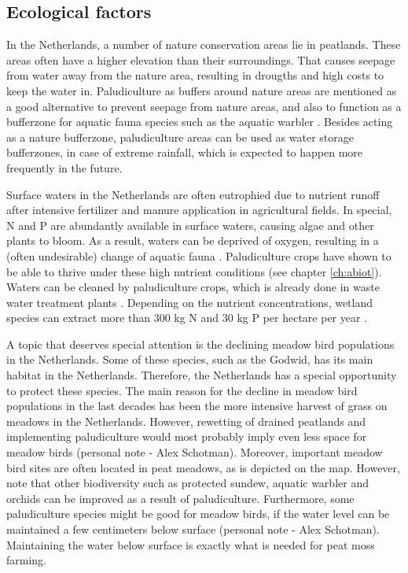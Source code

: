 \documentclass[a4paper,12pt]{scrbook}
\begin{document}
\subsection{Ecological factors}
In the Netherlands, a number of nature conservation areas lie in peatlands. These areas often have a higher elevation than their surroundings. That causes seepage from water away from the nature area, resulting in drougths and high costs to keep the water in. Paludiculture as buffers around nature areas are mentioned as a good alternative to prevent seepage from nature areas, and also to function as a bufferzone for aquatic fauna species such as the aquatic warbler \citep{van2013rewetting}. Besides acting as a nature bufferzone, paludiculture areas can be used as water storage bufferzones, in case of extreme rainfall, which is expected to happen more frequently in the future. 

Surface waters in the Netherlands are often eutrophied due to nutrient runoff after intensive fertilizer and manure application in agricultural fields. In special, N and P are abundantly available in surface waters, causing algae and other plants to bloom. As a result, waters can be deprived of oxygen, resulting in a (often undesirable) change of aquatic fauna \citep{waajen2014eutrophic}. Paludiculture crops have shown to be able to thrive under these high nutrient conditions (see chapter \ref{ch:abiot}). Waters can be cleaned by paludiculture crops, which is already done in waste water treatment plants \citep{}. Depending on the nutrient concentrations, wetland species can extract more than 300 kg N and 30 kg P per hectare per year \citep{Land2016}. 

A topic that deserves special attention is the declining meadow bird populations in the Netherlands. Some of these species, such as the Godwid, has its main habitat in the Netherlands. Therefore, the Netherlands has a special opportunity to protect these species. The main reason for the decline in meadow bird populations in the last decades has been the more intensive harvest of grass on meadows in the Netherlands. However, rewetting of drained peatlands and implementing paludiculture would most probably imply even less space for meadow birds (personal note - Alex Schotman). Moreover, important meadow bird sites are often located in peat meadows, as is depicted on the map. However, note that other biodiversity such as protected sundew, aquatic warbler and orchids can be improved as a result of paludiculture. Furthermore, some paludiculture species might be good for meadow birds, if the water level can be maintained a few centimeters below surface (personal note - Alex Schotman). Maintaining the water below surface is exactly what is needed for peat moss farming.
\end{document}
